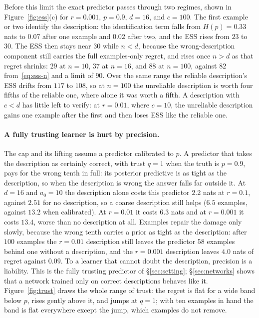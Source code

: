 \documentclass[10pt]{article}
\begin{document}
Before this limit the exact predictor passes through two regimes, shown in Figure~\ref{fig:ess}(c) for $r = 0.001$, $p = 0.9$, $d = 16$, and $c = 100$. The first example or two identify the description: the identification term falls from $H(p) = 0.33$ nats to $0.07$ after one example and $0.02$ after two, and the ESS rises from $23$ to $30$. The ESS then stays near $30$ while $n < d$, because the wrong-description component still carries the full examples-only regret, and rises once $n > d$ as that regret shrinks: $29$ at $n = 10$, $37$ at $n = 16$, and $88$ at $n = 100$, against $82$ from~\eqref{eq:ess-n} and a limit of $90$. Over the same range the reliable description's ESS drifts from $117$ to $108$, so at $n = 100$ the unreliable description is worth four fifths of the reliable one, where alone it was worth a fifth. A description with $c < d$ has little left to verify: at $r = 0.01$, where $c = 10$, the unreliable description gains one example after the first and then loses ESS like the reliable one.

\paragraph{A fully trusting learner is hurt by precision.}
The cap and its lifting assume a predictor calibrated to $p$. A predictor that takes the description as certainly correct, with trust $q = 1$ when the truth is $p = 0.9$, pays for the wrong tenth in full: its posterior predictive is as tight as the description, so when the description is wrong the answer falls far outside it. At $d = 16$ and $a_0 = 10$ the description alone costs this predictor $2.2$ nats at $r = 0.1$, against $2.51$ for no description, so a coarse description still helps ($6.5$ examples, against $13.2$ when calibrated). At $r = 0.01$ it costs $6.3$ nats and at $r = 0.001$ it costs $13.4$, worse than no description at all. Examples repair the damage only slowly, because the wrong tenth carries a prior as tight as the description: after $100$ examples the $r = 0.01$ description still leaves the predictor $58$ examples behind one without a description, and the $r = 0.001$ description leaves $4.0$ nats of regret against $0.09$. To a learner that cannot doubt the description, precision is a liability. This is the fully trusting predictor of \S\ref{sec:setting}; \S\ref{sec:networks} shows that a network trained only on correct descriptions behaves like it. Figure~\ref{fig:trust} draws the whole range of trust: the regret is flat for a wide band below $p$, rises gently above it, and jumps at $q = 1$; with ten examples in hand the band is flat everywhere except the jump, which examples do not remove.
\end{document}
